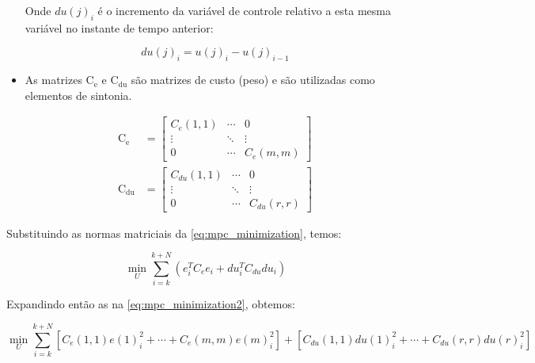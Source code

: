 \begin{itemize}
        Onde $du(j)_i$ é o incremento da variável de controle relativo a esta mesma variável no instante
        de tempo anterior:

        \begin{equation}
			du(j)_i = u(j)_i - u(j)_{i-1}
        \end{equation}
	
	\item As matrizes $\mathrm{C_e}$ e $\mathrm{C_{du}}$ são matrizes de custo (peso) e são utilizadas
        como elementos de sintonia.

        \begin{subequations}
            \label{eq:mpc_cost_matrix}
            \begin{align}
                \mathrm{C_e} &= 
                \begin{bmatrix}
                    C_e(1,1) & \cdots & 0   		\\
                    \vdots & \ddots & \vdots		\\
                    0 & \cdots & C_e(m,m)	
                \end{bmatrix}
                                                    \\
                \mathrm{C_{du}} &= 
                \begin{bmatrix}
                    C_{du}(1,1) & \cdots & 0   		\\
                    \vdots & \ddots & \vdots		\\
                    0 & \cdots & C_{du}(r,r)	
                \end{bmatrix}
            \end{align}
        \end{subequations}
	
\end{itemize}

Substituindo as normas matriciais da \cref{eq:mpc_minimization}, temos:

\begin{equation}
    \label{eq:mpc_minimization2}
    \min_{U} \sum_{i=k}^{k+N} ( e^T_i C_e e_i + du^T_i C_{du} du_i )
\end{equation}

Expandindo então as  na \cref{eq:mpc_minimization2},
obtemos:

\begin{equation}
    \label{eq:mpc_minimization3}
    \min_{U} \sum_{i=k}^{k+N} [C_e(1,1) e(1)^2_i + \cdots + C_e(m,m) e(m)^2_i] + 
                                [C_{du}(1,1) du(1)^2_i + \cdots + C_{du}(r,r) du(r)^2_i]
\end{equation}


